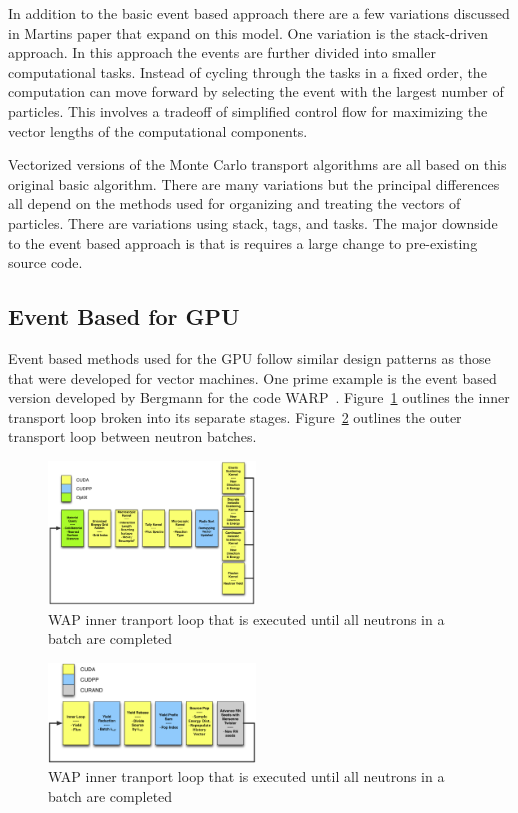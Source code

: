 In addition to the basic event based approach there are a few variations discussed in Martins paper that expand on this model.
%
One variation is the stack-driven approach.
%
In this approach the events are further divided into smaller computational tasks.
%
Instead of cycling through the tasks in a fixed order, the computation can move forward by selecting the event with the largest number of particles.
%
This involves a tradeoff of simplified control flow for maximizing the vector lengths of the computational components.
%

%
Vectorized versions of the Monte Carlo transport algorithms are all based on this original basic algorithm.
%
There are many variations but the principal differences all depend on the methods used for organizing and treating the vectors of particles.
%
There are variations using stack, tags, and tasks.
%
The major downside to the event based approach is that is requires a large change to pre-existing source code.
%

\subsection*{\textbf{Event Based for GPU}}

%
Event based methods used for the GPU follow similar design patterns as those that were developed for vector machines.
%
One prime example is the event based version developed by Bergmann for the code WARP~\cite{2014development}.
%
Figure~\ref{fig:innerLoopWARP} outlines the inner transport loop broken into its separate stages.
%
Figure~\ref{fig:outerLoopWARP} outlines the outer transport loop between neutron batches.
%

\begin{figure}
\includegraphics[width=0.49\textwidth]{InnerLoopWARP}
\caption{WAP inner tranport loop that is executed until all neutrons in a batch are completed~\cite{2014development}}
\label{fig:innerLoopWARP}
\end{figure}

\begin{figure}
\includegraphics[width=0.49\textwidth]{OuterLoopWARP}
\caption{WAP inner tranport loop that is executed until all neutrons in a batch are completed~\cite{2014development}}
\label{fig:outerLoopWARP}
\end{figure}

